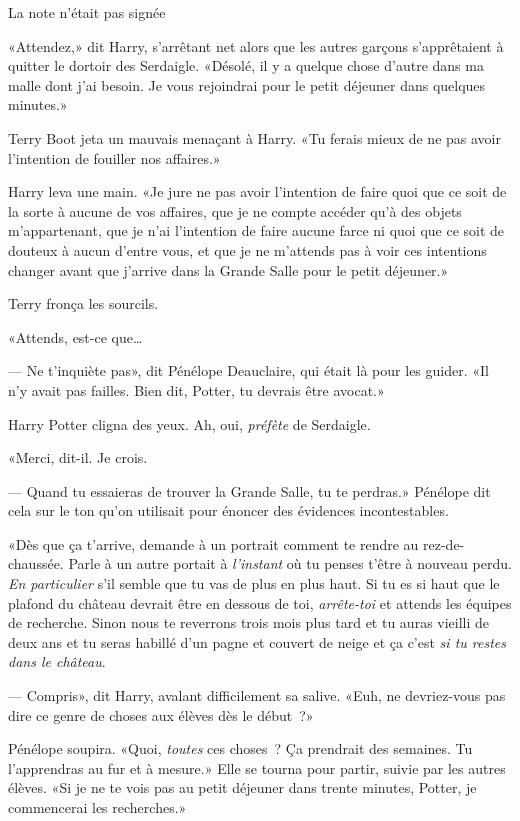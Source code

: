 La note n'était pas signée

\later

«Attendez,» dit Harry, s'arrêtant net alors que les autres garçons s'apprêtaient à quitter le dortoir des Serdaigle. «Désolé, il y a quelque chose d'autre dans ma malle dont j'ai besoin. Je vous rejoindrai pour le petit déjeuner dans quelques minutes.»

Terry Boot jeta un mauvais menaçant à Harry. «Tu ferais mieux de ne pas avoir l'intention de fouiller nos affaires.»

Harry leva une main. «Je jure ne pas avoir l'intention de faire quoi que ce soit de la sorte à aucune de vos affaires, que je ne compte accéder qu'à des objets m'appartenant, que je n'ai l'intention de faire aucune farce ni quoi que ce soit de douteux à aucun d'entre vous, et que je ne m'attends pas à voir ces intentions changer avant que j'arrive dans la Grande Salle pour le petit déjeuner.»

Terry fronça les sourcils.

«Attends, est-ce que…

--- Ne t'inquiète pas», dit Pénélope Deauclaire, qui était là pour les guider. «Il n'y avait pas failles. Bien dit, Potter, tu devrais être avocat.»

Harry Potter cligna des yeux. Ah, oui, \emph{préfète} de Serdaigle.

«Merci, dit-il. Je crois.

--- Quand tu essaieras de trouver la Grande Salle, tu te perdras.» Pénélope dit cela sur le ton qu'on utilisait pour énoncer des évidences incontestables.

«Dès que ça t'arrive, demande à un portrait comment te rendre au rez-de-chaussée. Parle à un autre portait à \emph{l'instant} où tu penses t'être à nouveau perdu. \emph{En particulier} s'il semble que tu vas de plus en plus haut. Si tu es si haut que le plafond du château devrait être en dessous de toi, \emph{arrête-toi} et attends les équipes de recherche. Sinon nous te reverrons trois mois plus tard et tu auras vieilli de deux ans et tu seras habillé d'un pagne et couvert de neige et ça c'est \emph{si tu restes dans le château}.

--- Compris», dit Harry, avalant difficilement sa salive. «Euh, ne devriez-vous pas dire ce genre de choses aux élèves dès le début~?»

Pénélope soupira. «Quoi, \emph{toutes} ces choses~? Ça prendrait des semaines. Tu l'apprendras au fur et à mesure.» Elle se tourna pour partir, suivie par les autres élèves. «Si je ne te vois pas au petit déjeuner dans trente minutes, Potter, je commencerai les recherches.»

